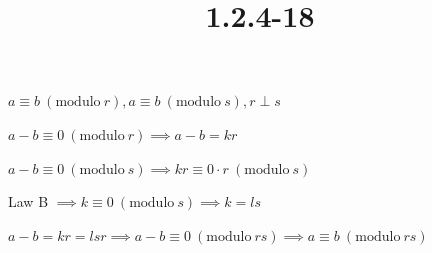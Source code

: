 \documentclass{article}
\title{1.2.4-18}
\begin{document}
\maketitle

$a \equiv b\ (\mathrm{modulo}\ r), a \equiv b\ (\mathrm{modulo}\ s), r \perp s$

$a - b \equiv 0\ (\mathrm{modulo}\ r) \implies a - b = kr$

$a - b \equiv 0\ (\mathrm{modulo}\ s) \implies kr \equiv 0\cdot r \ (\mathrm{modulo}\ s)$

Law B $\implies k \equiv 0\ (\mathrm{modulo}\ s) \implies k = ls$

$a - b = kr = lsr \implies a - b \equiv 0\ (\mathrm{modulo}\ rs) \implies a \equiv b\ (\mathrm{modulo}\ rs)$
\end{document}

